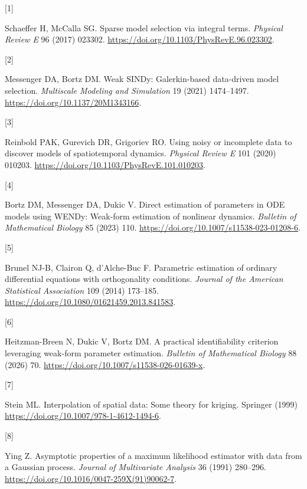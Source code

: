 \documentclass[ejs]{imsart}
\newlength{\cslhangindent}\setlength{\cslhangindent}{1.5em}
\newlength{\csllabelwidth}\setlength{\csllabelwidth}{3em}
\newenvironment{CSLReferences}[2]
 {\begin{list}{}{\setlength{\itemindent}{0pt}\setlength{\leftmargin}{0pt}\setlength{\parsep}{0pt}
 \ifodd #1\setlength{\leftmargin}{\cslhangindent}\setlength{\itemindent}{-1\cslhangindent}\fi
 \setlength{\itemsep}{#2\baselineskip}}}{\end{list}}
\newcommand{\CSLLeftMargin}[1]{\parbox[t]{\csllabelwidth}{\strut#1\strut}}
\newcommand{\CSLRightInline}[1]{\parbox[t]{\linewidth-\csllabelwidth}{\strut#1\strut}}
\begin{document}
\protect{}\label{refs}
\begin{CSLReferences}{0}{0}
\CSLLeftMargin{{[}1{]} }%
\CSLRightInline{Schaeffer H, McCalla SG. Sparse model selection via
integral terms. \emph{Physical Review E} 96 (2017) 023302.
\url{https://doi.org/10.1103/PhysRevE.96.023302}.}

\CSLLeftMargin{{[}2{]} }%
\CSLRightInline{Messenger DA, Bortz DM. Weak {SINDy}: Galerkin-based
data-driven model selection. \emph{Multiscale Modeling and Simulation}
19 (2021) 1474--1497. \url{https://doi.org/10.1137/20M1343166}.}

\CSLLeftMargin{{[}3{]} }%
\CSLRightInline{Reinbold PAK, Gurevich DR, Grigoriev RO. Using noisy or
incomplete data to discover models of spatiotemporal dynamics.
\emph{Physical Review E} 101 (2020) 010203.
\url{https://doi.org/10.1103/PhysRevE.101.010203}.}

\CSLLeftMargin{{[}4{]} }%
\CSLRightInline{Bortz DM, Messenger DA, Dukic V. Direct estimation of
parameters in {ODE} models using {WENDy}: Weak-form estimation of
nonlinear dynamics. \emph{Bulletin of Mathematical Biology} 85 (2023)
110. \url{https://doi.org/10.1007/s11538-023-01208-6}.}

\CSLLeftMargin{{[}5{]} }%
\CSLRightInline{{Brunel NJ-B, Clairon Q, d'Alche-Buc F}. Parametric
estimation of ordinary differential equations with orthogonality
conditions. \emph{Journal of the American Statistical Association} 109
(2014) 173--185. \url{https://doi.org/10.1080/01621459.2013.841583}.}

\CSLLeftMargin{{[}6{]} }%
\CSLRightInline{Heitzman-Breen N, Dukic V, Bortz DM. A practical
identifiability criterion leveraging weak-form parameter estimation.
\emph{Bulletin of Mathematical Biology} 88 (2026) 70.
\url{https://doi.org/10.1007/s11538-026-01639-x}.}

\CSLLeftMargin{{[}7{]} }%
\CSLRightInline{Stein ML. Interpolation of spatial data: Some theory for
kriging. Springer (1999)
\url{https://doi.org/10.1007/978-1-4612-1494-6}.}

\CSLLeftMargin{{[}8{]} }%
\CSLRightInline{Ying Z. Asymptotic properties of a maximum likelihood
estimator with data from a {G}aussian process. \emph{Journal of
Multivariate Analysis} 36 (1991) 280--296.
\url{https://doi.org/10.1016/0047-259X(91)90062-7}.}


\end{CSLReferences}
\end{document}
